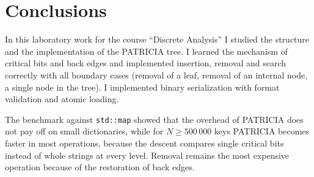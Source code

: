 \section{Conclusions}

In this laboratory work for the course \enquote{Discrete Analysis} I studied the structure and the
implementation of the PATRICIA tree. I learned the mechanism of critical bits and back edges and
implemented insertion, removal and search correctly with all boundary cases (removal of a leaf,
removal of an internal node, a single node in the tree). I implemented binary serialization with
format validation and atomic loading.

The benchmark against \texttt{std::map} showed that the overhead of PATRICIA does not pay off on
small dictionaries, while for $N \geq 500\,000$ keys PATRICIA becomes faster in most operations,
because the descent compares single critical bits instead of whole strings at every level.
Removal remains the most expensive operation because of the restoration of back edges.

\pagebreak
